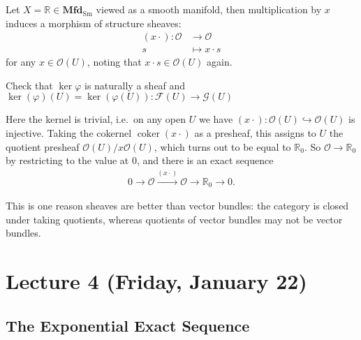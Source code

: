 \begin{example}[of morphisms]

Let \(X = {\mathbb{R}}\in {\mathbf{Mfd}}_{\operatorname{Sm}}\) viewed as
a smooth manifold, then multiplication by \(x\) induces a morphism of
structure sheaves:
\begin{align*}
(x \cdot): {\mathcal{O}}&\to {\mathcal{O}}\\
s & \mapsto x\cdot s
\end{align*}
for any \(x\in {\mathcal{O}}(U)\), noting that
\(x\cdot s\in {\mathcal{O}}(U)\) again.

\begin{exercise}[?]

Check that \(\ker \varphi\) is naturally a sheaf and
\(\ker(\varphi)(U) = \ker (\varphi(U)): \mathcal{F}(U) \to \mathcal{G}(U)\)

\end{exercise}

Here the kernel is trivial, i.e.~on any open \(U\) we have
\((x\cdot):{\mathcal{O}}(U) \hookrightarrow{\mathcal{O}}(U)\) is
injective. Taking the cokernel \(\operatorname{coker}(x\cdot)\) as a
presheaf, this assigns to \(U\) the quotient presheaf
\({\mathcal{O}}(U) / x{\mathcal{O}}(U)\), which turns out to be equal to
\({\mathbb{R}}_0\). So \({\mathcal{O}}\to {\mathbb{R}}_0\) by
restricting to the value at \(0\), and there is an exact sequence
\begin{align*}
0 \to {\mathcal{O}}\xrightarrow{(x\cdot)} {\mathcal{O}}\to {\mathbb{R}}_0 \to 0
.\end{align*}

This is one reason sheaves are better than vector bundles: the category
is closed under taking quotients, whereas quotients of vector bundles
may not be vector bundles.

\end{example}

\hypertarget{lecture-4-friday-january-22}{%
\section{Lecture 4 (Friday, January
22)}\label{lecture-4-friday-january-22}}

\hypertarget{the-exponential-exact-sequence}{%
\subsection{The Exponential Exact
Sequence}\label{the-exponential-exact-sequence}}

